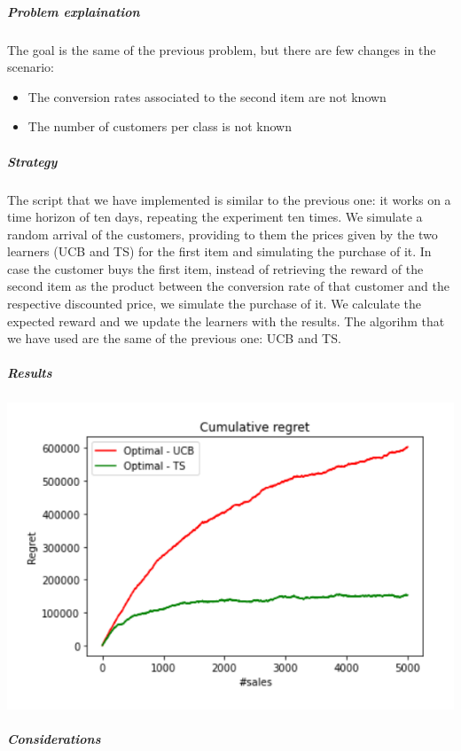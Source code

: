 \subparagraph*{Problem explaination}
The goal is the same of the previous problem, but there are few changes in the scenario:
\begin{itemize}
	\item The conversion rates associated to the second item are not known
	\item The number of customers per class is not known
\end{itemize}
\subparagraph*{Strategy}
The script that we have implemented is similar to the previous one: it works on a time horizon of ten days, repeating the experiment ten times. We simulate a random arrival of the customers, providing to them the prices given by the two learners (UCB and TS) for the first item and simulating the purchase of it. In case the customer buys the first item, instead of retrieving the reward of the second item as the product  between the conversion rate of that customer and the respective discounted price, 
we simulate the purchase of it. We calculate the expected reward and we update the learners with the results. 
The algorihm that we have used are the same of the previous one: UCB and TS.

\subparagraph*{Results}
\begin{center}
	\includegraphics[scale=1]{Images/n4}
\end{center}
\subparagraph*{Considerations}